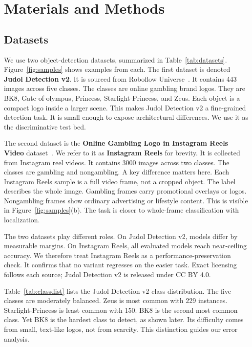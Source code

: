 \documentclass[conference,a4paper]{IEEEtran}
\begin{document}
\section{Materials and Methods}

\subsection{Datasets}
We use two object-detection datasets, summarized in Table~\ref{tab:datasets}.
Figure~\ref{fig:samples} shows examples from each. The first dataset is
denoted \textbf{Judol Detection v2}. It is sourced from Roboflow
Universe~\cite{dataset_v21_roboflow}. It contains 443 images across five
classes. The classes are online gambling brand logos. They are BK8,
Gate-of-olympus, Princess, Starlight-Princess, and Zeus. Each object is a
compact logo inside a larger scene. This makes Judol Detection v2 a fine-grained detection
task. It is small enough to expose architectural differences. We use it as
the discriminative test bed.

The second dataset is the \textbf{Online Gambling Logo in Instagram Reels
Video} dataset~\cite{dataset_judi3k_kaggle}. We refer to it as \textbf{Instagram
Reels} for brevity. It is collected from Instagram reel videos. It contains 3000
images across two classes. The classes are gambling and nongambling. A key difference matters
here. Each Instagram Reels sample is a full video frame, not a cropped object. The
label describes the whole image. Gambling frames carry promotional overlays
or logos. Nongambling frames show ordinary advertising or lifestyle content.
This is visible in Figure~\ref{fig:samples}(b). The task is closer to
whole-frame classification with localization.

The two datasets play different roles. On Judol Detection v2, models differ by measurable
margins. On Instagram Reels, all evaluated models reach near-ceiling accuracy. We
therefore treat Instagram Reels as a performance-preservation check. It confirms that
no variant regresses on the easier task. Exact licensing follows each source;
Judol Detection v2 is released under CC BY 4.0.

Table~\ref{tab:classdist} lists the Judol Detection v2 class distribution. The five classes
are moderately balanced. Zeus is most common with 229 instances. Starlight-Princess
is least common with 150. BK8 is the second most common class. Yet BK8 is the
hardest class to detect, as shown later. Its difficulty comes from small,
text-like logos, not from scarcity. This distinction guides our error analysis.
\end{document}

